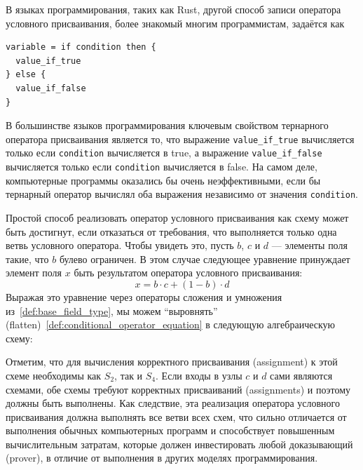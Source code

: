 В языках программирования, таких как Rust, другой способ записи оператора условного присваивания, более знакомый многим программистам, задаётся как
\begin{lstlisting}
variable = if condition then { 
  value_if_true 
} else { 
  value_if_false 
} 
\end{lstlisting}
В большинстве языков программирования ключевым свойством тернарного оператора присваивания является то, что выражение \texttt{value\_if\_true} вычисляется только если \texttt{condition} вычисляется в true, а выражение \texttt{value\_if\_false} вычисляется только если \texttt{condition} вычисляется в false. На самом деле, компьютерные программы оказались бы очень неэффективными, если бы тернарный оператор вычислял оба выражения независимо от значения \texttt{condition}.

Простой способ реализовать оператор условного присваивания как схему может быть достигнут, если отказаться от требования, что выполняется только одна ветвь условного оператора. Чтобы увидеть это, пусть $b$, $c$ и $d$ --- элементы поля такие, что $b$ булево ограничен. В этом случае следующее уравнение принуждает элемент поля $x$ быть результатом оператора условного присваивания:
\begin{equation}
\label{def:conditional_operator_equation}
x = b\cdot c + (1-b)\cdot d
\end{equation}
Выражая это уравнение через операторы сложения и умножения из~\ref{def:base_field_type}, мы можем ``выровнять'' (flatten)~\ref{def:conditional_operator_equation} в следующую алгебраическую схему:
\begin{center}
\end{center}
Отметим, что для вычисления корректного присваивания (assignment) к этой схеме необходимы как $S_2$, так и $S_4$. Если входы в узлы $c$ и $d$ сами являются схемами, обе схемы требуют корректных присваиваний (assignments) и поэтому должны быть выполнены. Как следствие, эта реализация оператора условного присваивания должна выполнять все ветви всех схем, что сильно отличается от выполнения обычных компьютерных программ и способствует повышенным вычислительным затратам, которые должен инвестировать любой доказывающий (prover), в отличие от выполнения в других моделях программирования.

